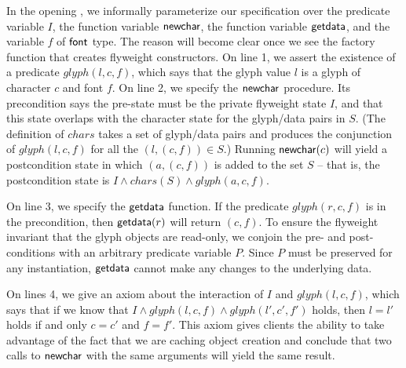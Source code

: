 \documentclass[preprint,natbib]{sigplanconf}
\begin{document}
In the opening , we informally parameterize our specification over the
predicate variable $I$, the function variable $\mbox{\textsf{{newchar}}}$, the
function variable $\mbox{\textsf{{getdata}}}$, and the variable $f$ of $\mbox{\textsf{{font}}}$
type. The reason will become clear once we see the factory function
that creates flyweight constructors.
%
On line 1, we assert the existence of a predicate $glyph(l, c, f)$,
which says that the glyph value $l$ is a glyph of character $c$ and
font $f$. On line 2, we specify the $\mbox{\textsf{{newchar}}}$ procedure. Its
precondition says the pre-state must be the private flyweight state
$I$, and that this state overlaps with the character state for the
glyph/data pairs in $S$. (The definition of $chars$ takes a set of
glyph/data pairs and produces the conjunction of $glyph(l,c,f)$ for
all the $(l,(c,f)) \in S$.)  Running $\mbox{\textsf{{newchar}}}(c)$ will yield a
postcondition state in which $(a, (c,f))$ is added to the set $S$ --
that is, the postcondition state is $I \land chars(S) \land
glyph(a,c,f)$.

On line 3, we specify the $\mbox{\textsf{{getdata}}}$ function. If the predicate
$glyph(r, c, f)$ is in the precondition, then $\mbox{\textsf{{getdata}}}(r)$
will return $(c, f)$.  To ensure the flyweight invariant that the
glyph objects are read-only, we conjoin the pre- and post-conditions
with an arbitrary predicate variable $P$. Since $P$ must be preserved
for any instantiation, $\mbox{\textsf{{getdata}}}$ cannot make any changes to
the underlying data.

On lines 4, we give an axiom about the interaction of $I$ and
$glyph(l,c,f)$, which says that if we know that $I \land glyph(l,c,f)
\land glyph(l',c', f')$ holds, then $l = l'$ holds if and only $c =
c'$ and $f = f'$. This axiom gives clients the ability to take
advantage of the fact that we are caching object creation and conclude
that two calls to $\mbox{\textsf{{newchar}}}$ with the same arguments will yield
the same result.
\end{document}
